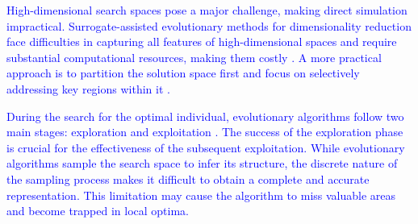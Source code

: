 \documentclass[journal,twoside]{IEEEtran}
\begin{document}
\textcolor{blue}{
High-dimensional search spaces pose a major challenge, making direct simulation impractical. Surrogate-assisted evolutionary methods for dimensionality reduction face difficulties in capturing all features of high-dimensional spaces and require substantial computational resources, making them costly \cite{9754323, he2023review, 9542966}. A more practical approach is to partition the solution space first and focus on selectively addressing key regions within it \cite{liu2023decision, 9428697}. }

\textcolor{blue}{
During the search for the optimal individual, evolutionary algorithms follow two main stages: exploration and exploitation \cite{9272701}. The success of the exploration phase is crucial for the effectiveness of the subsequent exploitation. While evolutionary algorithms sample the search space to infer its structure, the discrete nature of the sampling process makes it difficult to obtain a complete and accurate representation. This limitation may cause the algorithm to miss valuable areas and become trapped in local optima.}
\end{document}
